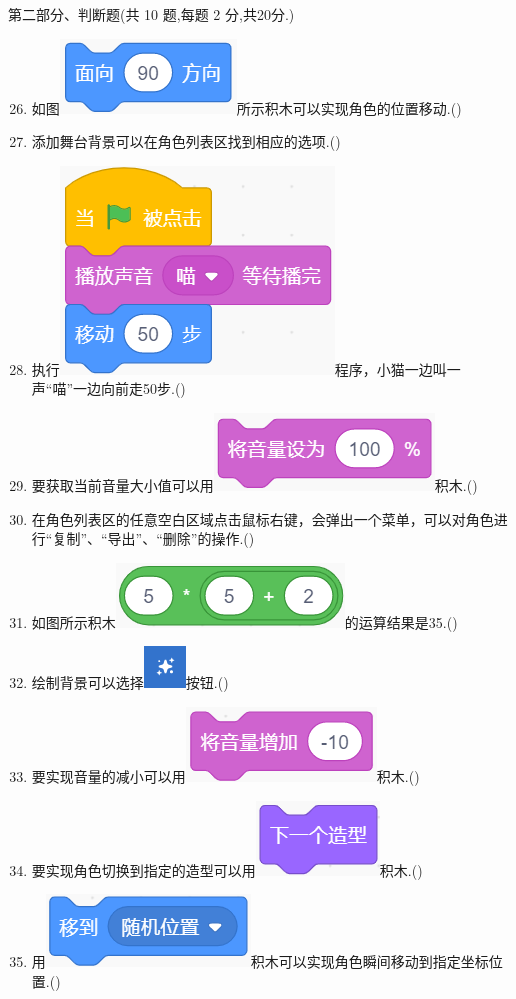 \documentclass[10.5pt, a4paper]{article}
\begin{document}
    \vspace{1cm}
    {\noindent\heiti 第二部分、判断题(共 10 题,每题 2 分,共20分.)}
    \begin{enumerate}
        \setcounter{enumi}{25}
        \item 如图\includegraphics[width=.1\textwidth]{26.png}所示积木可以实现角色的位置移动.(\qquad)

        \item 添加舞台背景可以在角色列表区找到相应的选项.(\qquad)
        
        \item 执行\includegraphics[width=.15\textwidth]{28.png}程序，小猫一边叫一声“喵”一边向前走50步.(\qquad)
  
        \item 要获取当前音量大小值可以用\includegraphics[width=.12\textwidth]{29.png}积木.(\qquad)
        
        \item 在角色列表区的任意空白区域点击鼠标右键，会弹出一个菜单，可以对角色进行“复制”、“导出”、“删除”的操作.(\qquad)
        
        \item 如图所示积木\includegraphics[width=.12\textwidth]{31.png}的运算结果是35.(\qquad)
        
        \item 绘制背景可以选择\includegraphics[width=.02\textwidth]{32.png}按钮.(\qquad)
        
        \item 要实现音量的减小可以用\includegraphics[width=.12\textwidth]{33.png}积木.(\qquad)
        
        \item 要实现角色切换到指定的造型可以用\includegraphics[width=.08\textwidth]{34.png}积木.(\qquad)
        
        \item 用\includegraphics[width=.12\textwidth]{35.png}积木可以实现角色瞬间移动到指定坐标位置.(\qquad)
    \end{enumerate}
\end{document}
